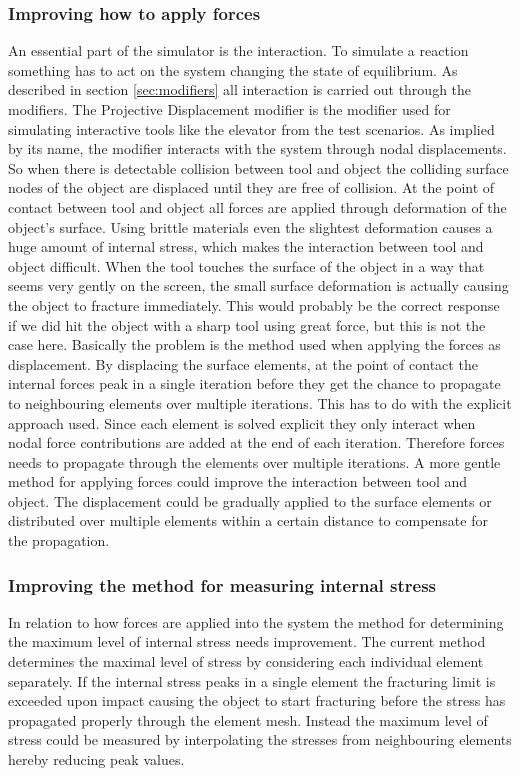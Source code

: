 \subsubsection*{Improving how to apply forces}
An essential part of the simulator is the interaction. To simulate a
reaction something has to act on the system changing the state of
equilibrium. As described in section \vref{sec:modifiers} all
interaction is carried out through the 
modifiers. The Projective Displacement modifier is the modifier used for
simulating interactive tools like the elevator from the test
scenarios. As implied by its name, the modifier interacts with the
system through nodal displacements. So when there is detectable
collision between tool and object the colliding surface nodes of the
object are displaced until they are free of collision. At the point of
contact between tool and object all forces are applied through
deformation of the object's surface. Using brittle
materials even the slightest deformation causes a huge amount of
internal stress, which makes the interaction between tool and object
difficult. When the tool touches the surface of the object in a way
that seems very gently on the screen, the small surface deformation is
actually causing the object to fracture immediately. This would
probably be the correct response if we did hit the object with a sharp
tool using great force, but this is not the case here. Basically the
problem is the method used when applying the forces as
displacement. By displacing the surface elements, at the
point of contact the internal forces peak in a single iteration before
they get the chance to propagate to neighbouring elements over
multiple iterations. This has to do with the explicit approach
used. Since each element is solved explicit they only interact when
nodal force contributions are added at the end of each
iteration. Therefore forces needs to propagate through the elements
over multiple iterations.
%
A more gentle method for applying forces could improve the interaction
between tool and object. The displacement could be gradually applied
to the surface elements or distributed over multiple elements within a
certain distance to compensate for the propagation.

\subsubsection*{Improving the method for measuring internal stress}
In relation to how forces are applied into the system the method for
determining the maximum level of internal stress needs
improvement. The current method determines the maximal level of stress
by considering each individual element separately. 
%
If the internal stress peaks in a single element
the fracturing limit is exceeded upon impact
causing the object to start fracturing before the stress has
propagated properly through the element mesh. Instead the maximum
level of stress could be measured by interpolating the stresses from
neighbouring elements hereby reducing peak values. 

